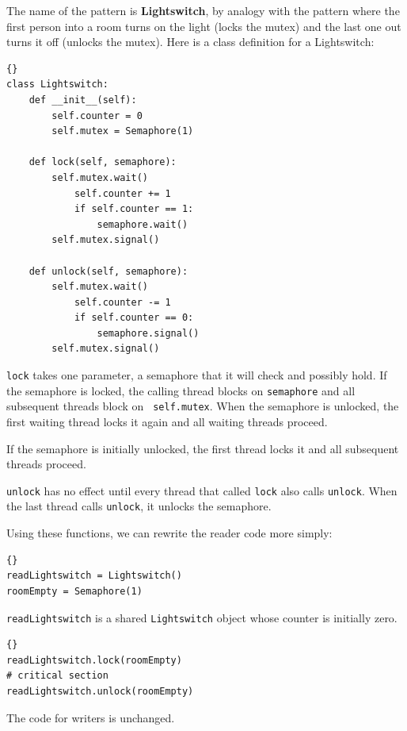 \documentclass{book}
\begin{document}
The name of the pattern is {\bf Lightswitch}, by analogy with the
pattern where the first person into a room turns on the light (locks
the mutex) and the last one out turns it off (unlocks the mutex).
Here is a class definition for a Lightswitch:

\begin{lstlisting}[title={Lightswitch definition}]{}
class Lightswitch:
    def __init__(self):
        self.counter = 0
        self.mutex = Semaphore(1)

    def lock(self, semaphore):
        self.mutex.wait()
            self.counter += 1
            if self.counter == 1:
                semaphore.wait()
        self.mutex.signal()

    def unlock(self, semaphore):
        self.mutex.wait()
            self.counter -= 1
            if self.counter == 0:
                semaphore.signal()
        self.mutex.signal()
\end{lstlisting}

{\tt lock} takes one parameter, a semaphore that it will check and
possibly hold.  If the semaphore is locked, the calling thread blocks
on {\tt semaphore} and all subsequent threads block on {\tt
        self.mutex}.  When the semaphore is unlocked, the first waiting thread
locks it again and all waiting threads proceed.

If the semaphore is initially unlocked, the first thread locks it
and all subsequent threads proceed.

    {\tt unlock} has no effect until every thread that called {\tt lock}
also calls {\tt unlock}.  When the last thread calls {\tt unlock}, it
unlocks the semaphore.

\newpage
Using these functions, we can rewrite the reader code
more simply:

\begin{lstlisting}[title={Readers-writers initialization}]{}
readLightswitch = Lightswitch()
roomEmpty = Semaphore(1)
\end{lstlisting}

{\tt readLightswitch} is a shared {\tt Lightswitch} object whose counter
is initially zero.

\begin{lstlisting}[title={Readers-writers solution (reader)}]{}
readLightswitch.lock(roomEmpty)
# critical section
readLightswitch.unlock(roomEmpty)
\end{lstlisting}

The code for writers is unchanged.
\end{document}
